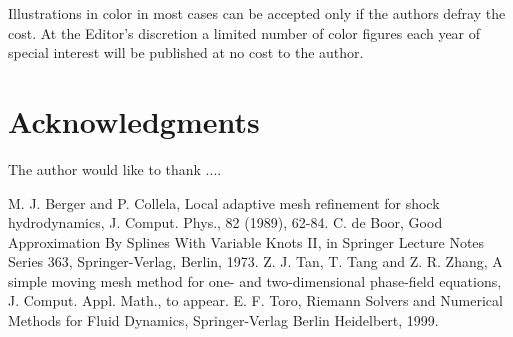 \documentclass[mathpazo]{cicp}
\begin{document}
Illustrations in color in most cases can be accepted
only if the authors defray the cost. At the Editor's discretion a limited number of color figures each year of special
interest will be published at no cost to the author.


\section*{Acknowledgments}
The author would like to thank  ....

\begin{thebibliography}{99}
M. J. Berger and P. Collela, Local adaptive mesh refinement
for shock hydrodynamics,
J. Comput. Phys., 82 (1989), 62-84.
C. de Boor,  Good Approximation By Splines With Variable Knots II, in Springer Lecture
 Notes Series 363, Springer-Verlag, Berlin, 1973.
 Z. J. Tan, T. Tang and Z. R. Zhang, A simple moving mesh method for one- and
two-dimensional phase-field equations, J. Comput. Appl. Math., to appear.
E. F. Toro, Riemann Solvers and Numerical Methods for Fluid Dynamics,
Springer-Verlag Berlin Heidelbert, 1999.
\end{thebibliography}
\end{document}
